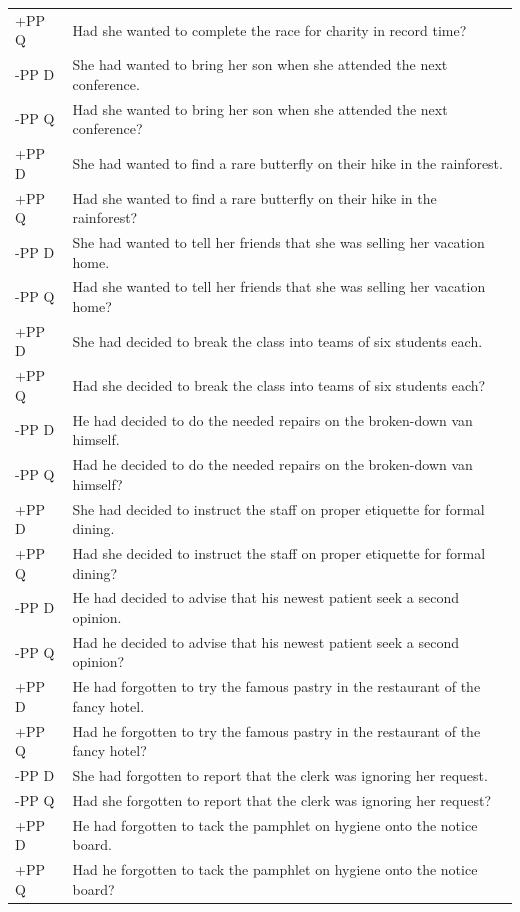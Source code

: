 \documentclass[12pt,oneside]{book}
\begin{document}
\begin{longtable}{ll}
+PP Q & Had she wanted to complete the race for charity in record time?\\
\addlinespace
-PP D & She had wanted to bring her son when she attended the next conference.\\
-PP Q & Had she wanted to bring her son when she attended the next conference?\\
\addlinespace
+PP D & She had wanted to find a rare butterfly on their hike in the rainforest.\\
+PP Q & Had she wanted to find a rare butterfly on their hike in the rainforest?\\
\addlinespace
-PP D & She had wanted to tell her friends that she was selling her vacation home.\\
-PP Q & Had she wanted to tell her friends that she was selling her vacation home?\\
\addlinespace
+PP D & She had decided to break the class into teams of six students each.\\
+PP Q & Had she decided to break the class into teams of six students each?\\
\addlinespace
-PP D & He had decided to do the needed repairs on the broken-down van himself.\\
-PP Q & Had he decided to do the needed repairs on the broken-down van himself?\\
\addlinespace
+PP D & She had decided to instruct the staff on proper etiquette for formal dining.\\
+PP Q & Had she decided to instruct the staff on proper etiquette for formal dining?\\
\addlinespace
-PP D & He had decided to advise that his newest patient seek a second opinion.\\
-PP Q & Had he decided to advise that his newest patient seek a second opinion?\\
\addlinespace
+PP D & He had forgotten to try the famous pastry in the restaurant of the fancy hotel.\\
+PP Q & Had he forgotten to try the famous pastry in the restaurant of the fancy hotel?\\
\addlinespace
-PP D & She had forgotten to report that the clerk was ignoring her request.\\
-PP Q & Had she forgotten to report that the clerk was ignoring her request?\\
\addlinespace
+PP D & He had forgotten to tack the pamphlet on hygiene onto the notice board.\\
+PP Q & Had he forgotten to tack the pamphlet on hygiene onto the notice board?\\

\end{longtable}
\end{document}
